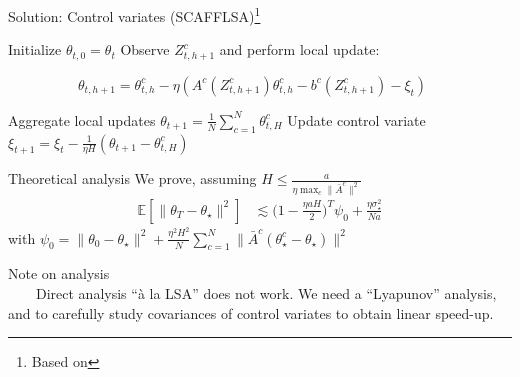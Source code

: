 \documentclass[aspectratio=169,14pt]{beamer}
\begin{document}
\begin{frame}{Solution: Control variates (SCAFFLSA)\footnote{Based on }}

  \vspace{0.5em}

  \small

  \begin{algorithmic}
    \State Initialize $\theta_{t,0} = \theta_t$
    \State Observe $Z^c_{t,h+1}$ and perform local update:
    \begin{center}
      ~~~~~~~~~~$\theta_{t,h+1} = \theta_{t,h}^c - \eta( A^c(Z^c_{t,h+1}) \theta_{t,h}^c - b^c(Z^c_{t,h+1}) - \xi_t)$
    \end{center}
  \vspace{-0.2em}
    \EndFor
  \vspace{-0.2em}
    \EndFor
    \State Aggregate local updates $\theta_{t+1} = \tfrac{1}{N} \sum\nolimits_{c=1}^{N} \theta_{t,H}^c $
    \State Update control variate $\xi_{t+1} = \xi_t - \frac{1}{\eta H} ( \theta_{t+1} - \theta_{t,H}^c )$
    \EndFor
  \end{algorithmic}
  \vspace{1.5em}
\end{frame}


\begin{frame}{Theoretical analysis}
  We prove, assuming $H \le \frac{a}{\eta \max_c \| \bar{A}^c \|^2}$
  \begin{align*}
    \mathbb{E}[\| \theta_{T} - \theta_\star \|^2]
    & \lesssim{}
      \big( 
      1 - \tfrac{\eta a H}{2}
      \big)^T \psi_0
      +
      \frac{\eta \sigma_\star^2}{N a}
  \end{align*}
  with $\psi_0 = \| \theta_0 - \theta_\star \|^2 + \frac{\eta^2H^2}{N} \sum_{c=1}^N \| \bar{A}^c( \theta_\star^c - \theta_\star) \|^2$


  \vspace{1em}

  \pause
  
  \small

  Note on analysis\\  
  ~~~~Direct analysis ``à la LSA'' does not work. We need a ``Lyapunov'' analysis, and to carefully study covariances of control variates to obtain linear speed-up.
\end{frame}
\end{document}
